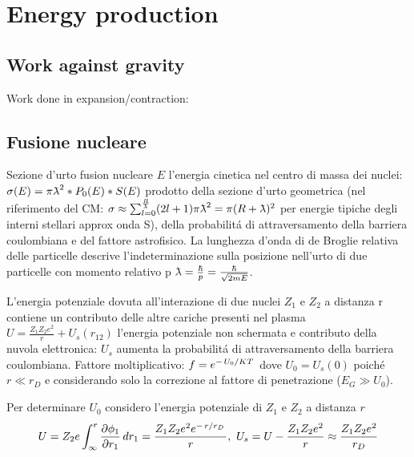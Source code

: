 \section{Energy production}

\subsection{Work against gravity}

\begin{frame}{Work done in expansion/contraction: }

\end{frame}

\subsection{Fusione nucleare}

\begin{frame}{Sezione d'urto fusion nucleare}
$E$ l'energia cinetica nel centro di massa dei nuclei: $\sigma(E)=\pi\lambdabar^2*P_0(E)*S(E)$
prodotto della sezione d'urto geometrica (nel riferimento del CM: $\sigma\approx\sum_{l=0}^{\frac{R}{\lambdabar}}(2l+1)\pi\lambdabar^2=\pi(R+\lambdabar)^2$
per energie tipiche degli interni stellari approx onda S), della probabilit\'a di attraversamento della barriera coulombiana e del fattore astrofisico. La lunghezza d'onda di de Broglie relativa delle particelle descrive l'indeterminazione sulla posizione nell'urto di due particelle con momento relativo p $\lambdabar=\frac{\hbar}{p}=\frac{\hbar}{\sqrt{2mE}}$.

L'energia potenziale dovuta all'interazione di due nuclei $Z_1$ e $Z_2$ a distanza r contiene un contributo delle altre cariche presenti nel plasma $U=\frac{Z_1Z_2e^2}{r}+U_s(r_{12})$
l'energia potenziale non schermata e contributo della nuvola elettronica: $U_s$ aumenta la probabilit\'a di attraversamento della barriera coulombiana. Fattore moltiplicativo: $f=e^{-\left.{U_0}\middle/{KT}\right.}$ dove $U_0=U_s(0)$ poich\'e $r\ll r_D$ e considerando solo la correzione al fattore di penetrazione ($E_G\gg U_0$).

Per determinare $U_0$ considero l'energia potenziale di $Z_1$ e $Z_2$ a distanza $r$
\begin{equation*}
U=Z_2e\int_{\infty}^r\PDy{r_1}{\phi_1}\,dr_1=\frac{Z_1Z_2e^2\exp{-\midfrac{r}{r_D}}}{r},\ U_s=U-\frac{Z_1Z_2e^2}{r}\approx\frac{Z_1Z_2e^2}{r_D}
\end{equation*}
\end{frame}


